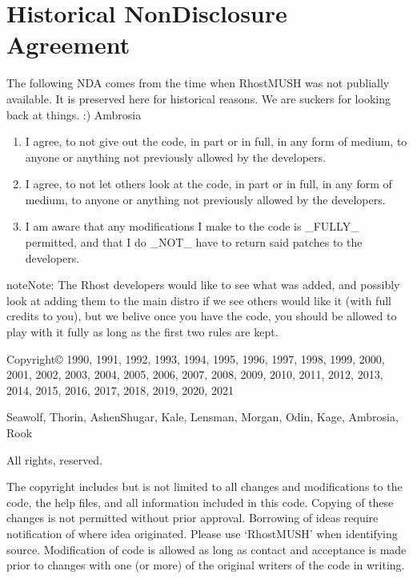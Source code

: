 \documentclass[letterpaper,10pt,english]{sphinxmanual}
\begin{document}
\chapter{Historical Non\sphinxhyphen{}Disclosure Agreement}
\label{\detokenize{nda:historical-non-disclosure-agreement}}\label{\detokenize{nda::doc}}
\sphinxAtStartPar
The following NDA comes from the time when RhostMUSH was not publially
available. It is preserved here for historical reasons. We are suckers for
looking back at things. :)
\textendash{}Ambrosia
\begin{enumerate}
%
\item {} 
\sphinxAtStartPar
I agree, to not give out the code, in part or in full, in any form of
medium, to anyone or anything not previously allowed by the developers.

\item {} 
\sphinxAtStartPar
I agree, to not let others look at the code, in part or in full, in
any form of medium, to anyone or anything not previously allowed by the
developers.

\item {} 
\sphinxAtStartPar
I am aware that any modifications I make to the code is \_FULLY\_
permitted, and that I do \_NOT\_ have to return said patches to the
developers.

\end{enumerate}

\begin{sphinxadmonition}{note}{Note:}
\sphinxAtStartPar
The Rhost developers would like to see what was added, and possibly
look at adding them to the main distro if we see others would like
it (with full credits to you), but we belive once you have the code,
you should be allowed to play with it fully as long as the first two
rules are kept.
\end{sphinxadmonition}

\sphinxAtStartPar
Copyright© 1990, 1991, 1992, 1993, 1994, 1995, 1996, 1997, 1998, 1999,
2000, 2001, 2002, 2003, 2004, 2005, 2006, 2007, 2008, 2009, 2010, 2011, 2012,
2013, 2014, 2015, 2016, 2017, 2018, 2019, 2020, 2021

\sphinxAtStartPar
Seawolf, Thorin, Ashen\sphinxhyphen{}Shugar, Kale, Lensman, Morgan, Odin, Kage, Ambrosia, Rook

\sphinxAtStartPar
All rights, reserved.

\sphinxAtStartPar
The copyright includes but is not limited to all changes and modifications to
the code, the help files, and all information included in this code.
Copying of these changes is not permitted without prior approval.
Borrowing of ideas require notification of where idea originated.
Please use ‘RhostMUSH’ when identifying source. Modification of code is allowed
as long as contact and acceptance is made prior to changes with one (or more) of
the original writers of the code in writing.
\end{document}
